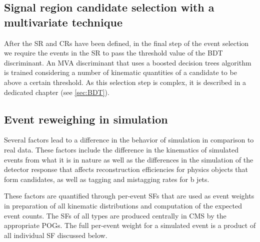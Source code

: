 \subsection{Signal region candidate selection with a multivariate technique}

After the SR and CRs have been defined, in the final step of the event selection we require the events in the SR to pass the threshold value of the BDT discriminant. An MVA discriminant that uses a boosted decision trees algorithm is trained considering a number of kinematic quantities of a candidate to be above a certain threshold. As this selection step is complex, it is described in a dedicated chapter (see \ref{sec:BDT}).

\subsection{Event reweighing in simulation}

Several factors lead to a difference in the behavior of simulation in comparison to real data. These factors include the difference in the kinematics of simulated events from what it is in nature as well as the differences in the simulation of the detector response that affects reconstruction efficiencies for physics objects that form candidates, as well as tagging and mistagging rates for b jets. 

These factors are quantified through per-event SFs that are used as event weights in preparation of all kinematic distributions and computation of the expected event counts. The SFs of all types are produced centrally in CMS by the appropriate POGs. The full per-event weight for a simulated event is a product of all individual SF discussed below.

